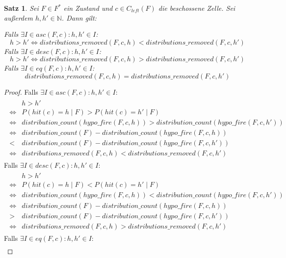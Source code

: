\documentclass[a4paper,12pt]{llncs}
\newcommand{\N}{{\mathbb{N}}}
\numberwithin{equation}{section}
\newtheorem{satz}{Satz}
\begin{document}
\begin{satz}
Sei $F\in F^*$ ein Zustand und $c \in C_{left}(F)$ die beschossene Zelle.
Sei außerdem $h,h' \in \N$.
Dann gilt:

Falls $\exists I \in asc(F, c) \colon h,h' \in I$:
\[
h > h' \Leftrightarrow distributions\_removed(F,c, h) < distributions\_removed(F,c, h')
\]
Falls $\exists I \in desc(F, c) \colon h,h' \in I$:
\[
h > h' \Leftrightarrow distributions\_removed(F,c, h) > distributions\_removed(F,c, h')
\]
Falls $\exists I \in eq(F, c) \colon h,h' \in I$:
\[
distributions\_removed(F,c, h) = distributions\_removed(F,c, h')
\]
\end{satz}
\begin{proof}
Falls $\exists I \in asc(F, c) \colon h,h' \in I$:
\begin{align}
\begin{split}
&h > h' \\
\Leftrightarrow &P(hit(c)=h \mid F) > P(hit(c)=h' \mid F) \\
\Leftrightarrow &distribution\_count(hypo\_fire(F,c, h)) > distribution\_count(hypo\_fire(F,c, h')) \\
\Leftrightarrow &distribution\_count(F) - distribution\_count(hypo\_fire(F,c, h)) \\
< &distribution\_count(F) - distribution\_count(hypo\_fire(F,c, h')) \\
\Leftrightarrow &distributions\_removed(F,c, h) < distributions\_removed(F,c, h')
\nonumber
\end{split}
\end{align}
Falls $\exists I \in desc(F, c) \colon h,h' \in I$:
\begin{align}
\begin{split}
&h > h' \\
\Leftrightarrow &P(hit(c)=h \mid F) < P(hit(c)=h' \mid F) \\
\Leftrightarrow &distribution\_count(hypo\_fire(F,c, h)) < distribution\_count(hypo\_fire(F,c, h')) \\
\Leftrightarrow &distribution\_count(F) - distribution\_count(hypo\_fire(F,c, h)) \\
> &distribution\_count(F) - distribution\_count(hypo\_fire(F,c, h')) \\
\Leftrightarrow &distributions\_removed(F,c, h) > distributions\_removed(F,c, h')
\nonumber
\end{split}
\end{align}
Falls $\exists I \in eq(F, c) \colon h,h' \in I$:
\begin{align}

\end{align}
\end{proof}
\end{document}
